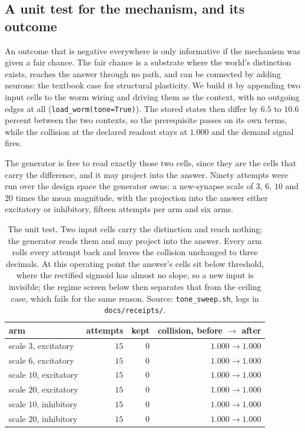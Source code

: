 \documentclass[11pt]{article}
\theoremstyle{remark}
\begin{document}
\subsection{A unit test for the mechanism, and its outcome}
\label{sec:unittest}

An outcome that is negative everywhere is only informative if the mechanism was given a fair chance.
The fair chance is a substrate where the world's distinction exists, reaches the answer through no
path, and can be connected by adding neurons: the textbook case for structural plasticity. We build
it by appending two input cells to the worm wiring and driving them as the context, with no outgoing
edges at all (\texttt{load\_worm(tone=True)}). The stored states then differ by $6.5$ to $10.6$
percent between the two contexts, so the prerequisite passes on its own terms, while the collision at
the declared readout stays at $1.000$ and the demand signal fires.

The generator is free to read exactly those two cells, since they are the cells that carry the
difference, and it may project into the answer. Ninety attempts were run over the design space the
generator owns: a new-synapse scale of $3$, $6$, $10$ and $20$ times the mean magnitude, with the
projection into the answer either excitatory or inhibitory, fifteen attempts per arm and six arms.

\begin{table}[t]
\centering
\small
\caption{The unit test. Two input cells carry the distinction and reach nothing; the generator reads
them and may project into the answer. Every arm rolls every attempt back and leaves the collision
unchanged to three decimals. At this operating point the answer's cells sit below threshold, where the
rectified sigmoid has almost no slope, so a new input is invisible; the regime screen below then
separates that from the ceiling case, which fails for the same reason. Source:
\texttt{tone\_sweep.sh}, logs in \texttt{docs/receipts/}.}
\label{tab:unittest}
\begin{tabular}{lrrr}
\toprule
arm & attempts & kept & collision, before $\to$ after \\
\midrule
scale $3$, excitatory & $15$ & $0$ & $1.000 \to 1.000$ \\
scale $6$, excitatory & $15$ & $0$ & $1.000 \to 1.000$ \\
scale $10$, excitatory & $15$ & $0$ & $1.000 \to 1.000$ \\
scale $20$, excitatory & $15$ & $0$ & $1.000 \to 1.000$ \\
scale $10$, inhibitory & $15$ & $0$ & $1.000 \to 1.000$ \\
scale $20$, inhibitory & $15$ & $0$ & $1.000 \to 1.000$ \\
\bottomrule
\end{tabular}
\end{table}
\end{document}
